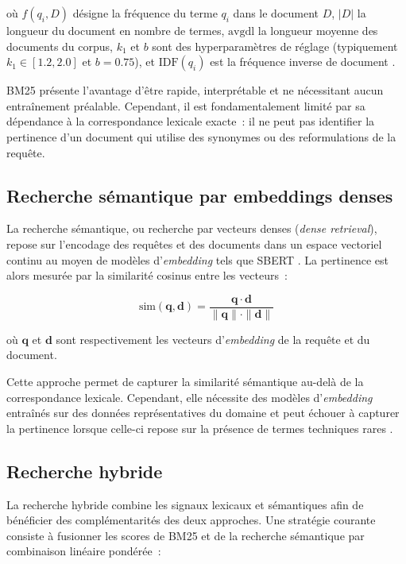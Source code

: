 \documentclass[12pt,a4paper,oneside]{report}
\begin{document}
\noindent où $f(q_i, D)$ désigne la fréquence du terme $q_i$ dans le document $D$, $|D|$ la longueur du document en nombre de termes, $\text{avgdl}$ la longueur moyenne des documents du corpus, $k_1$ et $b$ sont des hyperparamètres de réglage (typiquement $k_1 \in [1.2, 2.0]$ et $b = 0.75$), et $\text{IDF}(q_i)$ est la fréquence inverse de document \citep{robertson2009}.

BM25 présente l'avantage d'être rapide, interprétable et ne nécessitant aucun entraînement préalable. Cependant, il est fondamentalement limité par sa dépendance à la correspondance lexicale exacte~: il ne peut pas identifier la pertinence d'un document qui utilise des synonymes ou des reformulations de la requête.

\subsection{Recherche sémantique par embeddings denses}

La recherche sémantique, ou recherche par vecteurs denses (\textit{dense retrieval}), repose sur l'encodage des requêtes et des documents dans un espace vectoriel continu au moyen de modèles d'\textit{embedding} tels que SBERT \citep{reimers2019}. La pertinence est alors mesurée par la similarité cosinus entre les vecteurs~:

\begin{equation}
\text{sim}(\mathbf{q}, \mathbf{d}) = \frac{\mathbf{q} \cdot \mathbf{d}}{\|\mathbf{q}\| \cdot \|\mathbf{d}\|}
\label{eq:cosine}
\end{equation}

\noindent où $\mathbf{q}$ et $\mathbf{d}$ sont respectivement les vecteurs d'\textit{embedding} de la requête et du document.

Cette approche permet de capturer la similarité sémantique au-delà de la correspondance lexicale. Cependant, elle nécessite des modèles d'\textit{embedding} entraînés sur des données représentatives du domaine et peut échouer à capturer la pertinence lorsque celle-ci repose sur la présence de termes techniques rares \citep{gao2024}.

\subsection{Recherche hybride}

La recherche hybride combine les signaux lexicaux et sémantiques afin de bénéficier des complémentarités des deux approches. Une stratégie courante consiste à fusionner les scores de BM25 et de la recherche sémantique par combinaison linéaire pondérée~:
\end{document}
